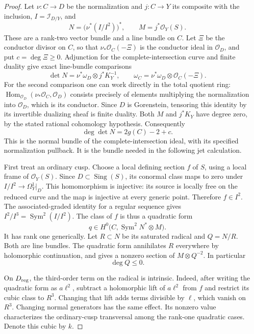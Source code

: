 \begin{proof}
Let $\nu:C\to D$ be the normalization and $j:C\to Y$
its composite with the inclusion,
$I=\mathcal I_{D/Y}$, and
\[
 N=\bigl(\nu^*(I/I^2)\bigr)^*,\qquad
 M=j^*\mathcal O_Y(S).
\]
These are a rank-two vector bundle and a line bundle on $C$.
Let $\Xi$ be the conductor divisor on $C$, so that
$\nu_*\mathcal O_C(-\Xi)$ is the conductor ideal in
$\mathcal O_D$, and put $c=\deg\Xi\geq0$.
Adjunction for the complete-intersection curve and finite
duality give exact line-bundle comparisons
\[
 \det N=\nu^*\omega_D\otimes j^*K_Y^{-1},\qquad
 \omega_C=\nu^*\omega_D\otimes\mathcal O_C(-\Xi).
                                                        \tag{A.J.1}\label{cdp:eq:A.J.1}
\]
For the second comparison one can work directly in the total
quotient ring: $\operatorname{Hom}_{\mathcal O_D}
(\nu_*\mathcal O_C,\mathcal O_D)$ consists precisely of
elements multiplying the normalization into $\mathcal O_D$,
which is its conductor. Since $D$ is Gorenstein, tensoring
this identity by its invertible dualizing sheaf is finite
duality. Both $M$ and $j^*K_Y$ have degree zero, by the
stated rational cohomology hypothesis. Consequently
\[
 \deg\det N=2g(C)-2+c.                              \tag{A.J.2}\label{cdp:eq:A.J.2}
\]
This is the normal bundle of the complete-intersection ideal,
with its specified normalization pullback. It is the bundle
needed in the following jet calculation.

First treat an ordinary cusp. Choose a local defining section
$f$ of $S$, using a local frame of $\mathcal O_Y(S)$.
Since $D\subset\operatorname{Sing}(S)$, its conormal class
maps to zero under
$I/I^2\to\Omega_Y^1|_D$. This homomorphism is injective:
its source is locally free on the reduced curve and the map
is injective at every generic point. Therefore $f\in I^2$.
The associated-graded identity for a regular sequence gives
$I^2/I^3=\operatorname{Sym}^2(I/I^2)$. The class of $f$
is thus a quadratic form
\[
 q\in H^0\bigl(C,\operatorname{Sym}^2N^*\otimes M\bigr).
\]
It has rank one generically. Let $R\subset N$ be its
saturated radical and $Q=N/R$. Both are line bundles.
The quadratic form annihilates $R$ everywhere by holomorphic
continuation, and gives a nonzero section of $M\otimes Q^{-2}$.
In particular
\[
 \deg Q\leq0.                                      \tag{A.J.3}\label{cdp:eq:A.J.3}
\]

On $D_{\rm reg}$, the third-order term on the radical is
intrinsic. Indeed, after writing the quadratic form as
$a\ell^2$, subtract a holomorphic lift of $a\ell^2$ from
$f$ and restrict its cubic class to $R^3$. Changing that lift
adds terms divisible by $\ell$, which vanish on $R^3$.
Changing normal generators has the same effect. Its nonzero
value characterizes the ordinary-cusp transversal among the
rank-one quadratic cases. Denote this cubic by $k$.


\end{proof}
